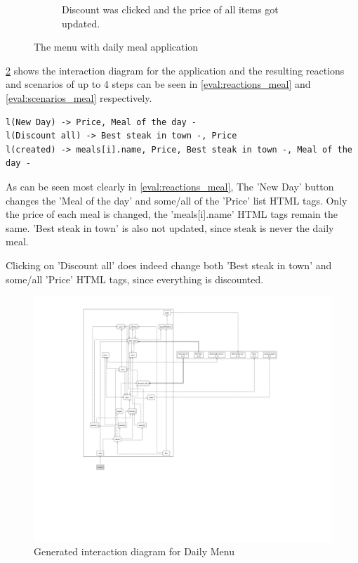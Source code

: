 \begin{figure}[H]
\begin{subfigure}[b]{0.45\textwidth}
        \caption{Discount was clicked and the price of all items got updated.}
    \end{subfigure}
    \caption{The menu with daily meal application }
    \label{fig:eval_image_meal}
\end{figure}

\ref{fig:diagram_meal_list_properties} shows the interaction diagram for the application and the resulting reactions and scenarios of up to 4 steps can be seen in \ref{eval:reactions_meal} and \ref{eval:scenarios_meal} respectively.

\label{eval:reactions_meal}
\begin{lstlisting}
l(New Day) -> Price, Meal of the day -
l(Discount all) -> Best steak in town -, Price
l(created) -> meals[i].name, Price, Best steak in town -, Meal of the day -
\end{lstlisting}

As can be seen most clearly in \ref{eval:reactions_meal}, The 'New Day' button changes the 'Meal of the day' and some/all of the 'Price' list HTML tags. Only the price of each meal is changed, the 'meals[i].name' HTML tags remain the same. 'Best steak in town' is also not updated, since steak is never the daily meal. 

Clicking on 'Discount all' does indeed change both 'Best steak in town' and some/all 'Price' HTML tags, since everything is discounted.

\begin{figure}[H]
    \includegraphics[width=\textwidth]{images/diagram_meal.png}
     \caption{Generated interaction diagram for Daily Menu}
     \label{fig:diagram_meal_list_properties}
\end{figure}

